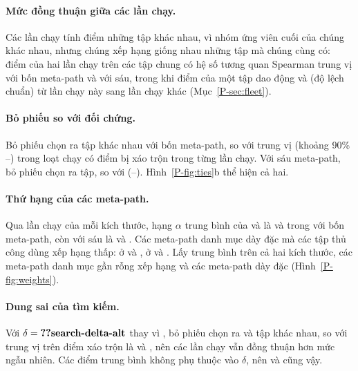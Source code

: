\paragraph{Mức đồng thuận giữa các lần chạy.} Các lần chạy tính điểm những tập khác nhau, vì nhóm
ứng viên cuối của chúng khác nhau, nhưng chúng xếp hạng giống nhau những tập mà chúng cùng có: điểm
của hai lần chạy trên các tập chung có hệ số tương quan Spearman trung vị  với
bốn meta-path và  với sáu, trong khi điểm của một tập dao động
 và  (độ lệch chuẩn) từ lần chạy này sang lần chạy khác
(Mục~\ref*{P-sec:fleet}).

\paragraph{Bỏ phiếu so với đối chứng.} Bỏ phiếu chọn ra  tập khác nhau với bốn
meta-path, so với trung vị  (khoảng 90\%
--) trong  loạt chạy có điểm bị
xáo trộn trong từng lần chạy. Với sáu meta-path, bỏ phiếu chọn ra  tập,
so với  (--). Hình~\ref*{P-fig:ties}b thể
hiện cả hai.

\paragraph{Thứ hạng của các meta-path.} Qua  lần chạy của mỗi kích thước, hạng
$\alpha$ trung bình của  và  là  và 
trong  với bốn meta-path, còn với sáu là  và .
Các meta-path danh mục dày đặc mà các tập thủ công dùng xếp hạng thấp:  ở
 và ,  ở  và . Lấy
trung bình trên cả hai kích thước, các meta-path danh mục gần rỗng xếp hạng 
và các meta-path dày đặc  (Hình~\ref*{P-fig:weights}).

\paragraph{Dung sai của tìm kiếm.} Với $\delta = \val{search-delta-alt}$ thay vì
, bỏ phiếu chọn ra  và  tập khác
nhau, so với trung vị trên điểm xáo trộn là  và
, nên các lần chạy vẫn đồng thuận hơn mức ngẫu nhiên. Các điểm trung
bình không phụ thuộc vào $\delta$, nên  và  cũng vậy.

